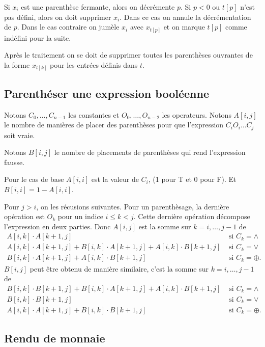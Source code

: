 \documentclass[12pt]{article}
\begin{document}
Si $x_i$ est une parenthèse fermante, alors on décrémente $p$.  Si $p<0$ ou
$t[p]$ n'est pas défini, alors on doit supprimer $x_i$. Dans ce cas on annule
la décrémentation de $p$.  Dans le cas contraire on jumèle $x_i$ avec
$x_{t[p]}$ et on marque $t[p]$ comme indéfini pour la suite.

Après le traitement on se doit de supprimer toutes les parenthèses ouvrantes
de la forme $x_{t[k]}$ pour les entrées définis dans $t$.

\subsection{Parenthéser une expression booléenne}

Notons $C_0,\ldots, C_{n-1}$ les constantes et $O_{0},\ldots,O_{n-2}$ les
operateurs. Notons $A[i,j]$ le nombre de manières de placer des parenthèses
pour que l'expression $C_i O_i \ldots C_j$ soit vraie.

Notons $B[i,j]$ le nombre de placements de parenthèses qui rend l'expression fausse. 

Pour le cas de base $A[i,i]$ est la valeur de $C_i$, (1 pour T et 0 pour F).
Et $B[i,i]=1-A[i,i]$.

Pour $j>i$, on les récusions suivantes.
Pour un parenthèsage, la dernière opération est $O_k$ pour un indice $i\leq k < j$.
Cette dernière opération décompose l'expression en deux parties. Donc
$A[i,j]$ est la somme sur $k=i,\ldots,j-1$ de
\begin{align*}
    A[i,k]\cdot A[k+1,j] & \textrm{ si } C_k=\wedge \\
    A[i,k]\cdot A[k+1,j] + B[i,k]\cdot A[k+1,j] + A[i,k]\cdot B[k+1,j] & \textrm{ si } C_k=\vee \\
    B[i,k]\cdot A[k+1,j] + A[i,k]\cdot B[k+1,j] & \textrm{ si } C_k=\oplus.
\end{align*}
$B[i,j]$ peut être obtenu de manière similaire, c'est la somme sur $k=i,\ldots,j-1$ de
\begin{align*}
    B[i,k]\cdot B[k+1,j] + B[i,k]\cdot A[k+1,j] + A[i,k]\cdot B[k+1,j] & \textrm{ si } C_k=\wedge \\
    B[i,k]\cdot B[k+1,j] & \textrm{ si } C_k=\vee \\
    A[i,k]\cdot A[k+1,j] + B[i,k]\cdot B[k+1,j] & \textrm{ si } C_k=\oplus.
\end{align*}

\subsection{Rendu de monnaie}
\end{document}
